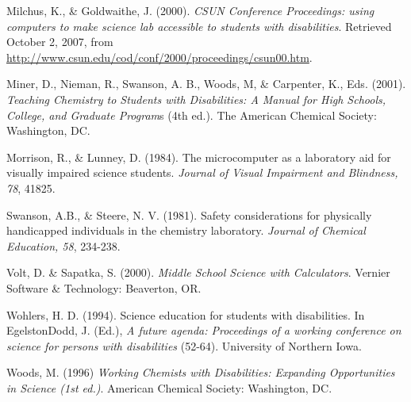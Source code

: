 \documentclass[11.5pt]{sig-alternate} %
\begin{document}
Milchus, K., \& Goldwaithe, J. (2000). \textit{CSUN Conference Proceedings: using computers to make science lab accessible to students with disabilities}. Retrieved October 2, 2007, from \url{http://www.csun.edu/cod/conf/2000/proceedings/csun00.htm}. 
 
Miner, D., Nieman, R., Swanson, A. B., Woods, M, \& Carpenter, K., Eds. (2001). \textit{Teaching Chemistry to Students with Disabilities: A Manual for High Schools,  College, and Graduate Program}s (4th ed.). The American Chemical Society: Washington, DC. 
 
Morrison, R., \& Lunney, D. (1984). The microcomputer as a laboratory aid for visually impaired science students. \textit{Journal of Visual Impairment and Blindness, 78}, 41825. 
 
Swanson, A.B., \& Steere, N. V. (1981). Safety considerations for physically handicapped individuals in the chemistry laboratory. \textit{Journal of Chemical Education, 58}, 234-238. 
 
Volt, D. \& Sapatka, S. (2000). \textit{Middle School Science with Calculators}. Vernier Software \& Technology: Beaverton, OR. 
 
Wohlers, H. D. (1994). Science education for students with disabilities. In EgelstonDodd, J. (Ed.), \textit{A future agenda: Proceedings of a working conference on science for persons with disabilities} (52-64). University of Northern Iowa. 
 
Woods, M. (1996) \textit{Working Chemists with Disabilities: Expanding Opportunities in Science (1st ed.)}. American Chemical Society: Washington, DC. 
\end{document}
